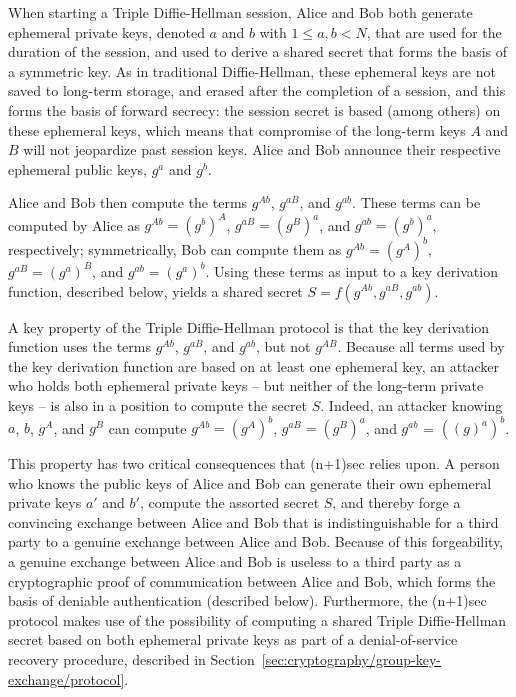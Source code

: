 \documentclass{article}
\begin{document}
When starting a Triple Diffie-Hellman session, Alice and Bob both generate ephemeral private keys, denoted $a$ and $b$ with $1 \leq a, b < N$, that are used for the duration of the session, and used to derive a shared secret that forms the basis of a symmetric key.
As in traditional Diffie-Hellman, these ephemeral keys are not saved to long-term storage, and erased after the completion of a session, and this forms the basis of forward secrecy: the session secret is based (among others) on these ephemeral keys, which means that compromise of the long-term keys $A$ and $B$ will not jeopardize past session keys.
Alice and Bob announce their respective ephemeral public keys, $g^a$ and $g^b$.

Alice and Bob then compute the terms $g^{Ab}$, $g^{aB}$, and $g^{ab}$.
These terms can be computed by Alice as $g^{Ab} = (g^b)^A$, $g^{aB} = (g^B)^a$, and $g^{ab} = (g^b)^a$, respectively; symmetrically, Bob can compute them as $g^{Ab} = (g^A)^b$, $g^{aB} = (g^a)^B$, and $g^{ab} = (g^a)^b$.
Using these terms as input to a key derivation function, described below, yields a shared secret $S = f(g^{Ab}, g^{aB}, g^{ab})$.

A key property of the Triple Diffie-Hellman protocol is that the key derivation function uses the terms $g^{Ab}$, $g^{aB}$, and $g^{ab}$, but not $g^{AB}$.
Because all terms used by the key derivation function are based on at least one ephemeral key, an attacker who holds both ephemeral private keys -- but neither of the long-term private keys -- is also in a position to compute the secret $S$.
Indeed, an attacker knowing $a$, $b$, $g^A$, and $g^B$ can compute $g^{Ab} = (g^A)^b$, $g^{aB} = (g^B)^a$, and $g^{ab}$ = $((g)^a)^b$.

This property has two critical consequences that (n+1)sec relies upon.
A person who knows the public keys of Alice and Bob can generate their own ephemeral private keys $a'$ and $b'$, compute the assorted secret $S$, and thereby forge a convincing exchange between Alice and Bob that is indistinguishable for a third party to a genuine exchange between Alice and Bob.
Because of this forgeability, a genuine exchange between Alice and Bob is useless to a third party as a cryptographic proof of communication between Alice and Bob, which forms the basis of deniable authentication (described below).
Furthermore, the (n+1)sec protocol makes use of the possibility of computing a shared Triple Diffie-Hellman secret based on both ephemeral private keys as part of a denial-of-service recovery procedure, described in Section~\ref{sec:cryptography/group-key-exchange/protocol}.
\end{document}
